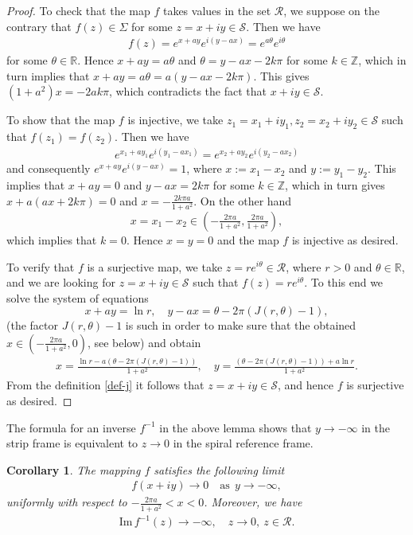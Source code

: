 \documentclass[11pt, letterpaper, reqno]{amsart}
\numberwithin{equation}{section}
\theoremstyle{definition}
\theoremstyle{plain}
\newtheorem{cor}[defi]{Corollary}
\numberwithin{equation}{section}
\def\R{\mathbb{R}}
\def\Z{\mathbb{Z}}
\def\RR{\mathcal{R}}
\def\SS{\mathcal{S}}
\begin{document}
\begin{proof}
To check that the map $f$ takes values in the set $\mathcal{R}$, we suppose on the contrary that $f(z)\in\Sigma$ for some $z = x+iy\in \SS$. Then we have
\begin{align*}
f(z) = e^{x+ay} e^{i(y-ax)} = e^{a\theta}e^{i\theta}
\end{align*}
for some $\theta\in\R$. Hence $x+ay = a\theta$ and $\theta = y-ax - 2k\pi$ for some $k\in\Z$, which in turn implies that
$x+ay = a\theta = a(y-ax - 2k\pi)$. This gives $(1+a^{2})x = - 2ak\pi$, which contradicts the fact that $x+iy\in\SS$.

To show that the map $f$ is injective, we take $z_{1} = x_{1} + iy_{1},z_{2} = x_{2} + iy_{2}\in \SS$ such that
$f(z_{1}) = f(z_{2})$. Then we have
\begin{align*}
e^{x_{1}+ay_{1}} e^{i(y_{1}-ax_{1})} = e^{x_{2}+ay_{2}} e^{i(y_{2}-ax_{2})}
\end{align*}
and consequently $e^{x+ay} e^{i(y-ax)} = 1$, where $x:=x_{1}-x_{2}$ and $y:=y_{1}-y_{2}$. This implies that $x+ay = 0$ and $y-ax = 2k\pi$ for some $k\in\Z$, which in turn gives $x + a(ax+2k\pi) = 0$ and $x=-\tfrac{2k\pi a}{1+a^{2}}$.
On the other hand $$x=x_{1}-x_{2}\in\left(-\tfrac{2\pi a}{1+a^{2}}, \tfrac{2\pi a}{1+a^{2}}\right),$$ which implies that $k=0$. Hence $x=y=0$ and the map $f$ is injective as desired.

To verify that $f$ is a surjective map, we take $z = re^{i\theta}\in\mathcal{R}$, where $r>0$ and $\theta\in\R$, and we are looking for $z=x+iy\in \SS$ such that $f(z) = re^{i\theta}$.
To this end we solve the system of equations
$$x+ay = \ln r, \quad y-ax = \theta - 2\pi(J(r,\theta) - 1),$$ (the factor $J(r,\theta)-1$ is such in order to make sure that the obtained $x\in (-\frac{2\pi a}{1+a^2},0)$, see below) and obtain
\begin{align*}
x =  \frac{\ln r - a(\theta - 2\pi(J(r,\theta) - 1))}{1 + a^{2}}, \quad y = \frac{(\theta - 2\pi(J(r,\theta) - 1)) + a\ln r}{1 + a^{2}}.
\end{align*}
From the definition \eqref{def-j} it follows that $z=x+iy\in \SS$, and hence $f$ is surjective as desired.
\end{proof}
The formula for an inverse $f^{-1}$ in the above lemma shows that $y\rightarrow -\infty$ in the strip frame is equivalent to $z\rightarrow 0$ in the spiral reference frame. 
\begin{cor}
The mapping $f$ satisfies the following limit
\begin{align}\label{lim-f1}
f(x+iy)\to 0 \quad \text{as}  \ \ y\to-\infty,
\end{align}
uniformly with respect to $-\tfrac{2\pi a}{1+a^2}<x<0$. Moreover, we have
\begin{align*}
\mathrm{Im}\, f^{-1}(z)\to -\infty, \quad z\to 0, \ z\in\RR.
\end{align*}
\end{cor}
\end{document}

